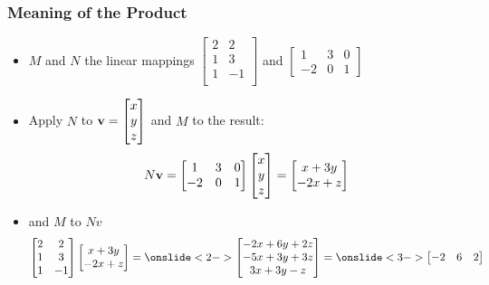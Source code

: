 \documentclass[8pt,dvipsnames]{beamer}
\begin{document}
\begin{frame}
  \frametitle{Meaning of the Product}
  \begin{itemize}
  \item $M$ and $N$ the linear mappings $
    \begin{bmatrix}
      2 & 2\\
      1 & 3\\
      1 & -1\\
    \end{bmatrix}
    $ and 
    $
    \begin{bmatrix}
      1 & 3 & 0\\
      -2 & 0 & 1
    \end{bmatrix}
    $
  \item
    Apply $N$ to $
    \bv = \begin{bmatrix}
      x \\ y \\ z
    \end{bmatrix}
    $
    and $M$ to the result:
    $$
    N \bv = \begin{bmatrix}
      1 & 3 & 0\\
      -2 & 0 & 1
    \end{bmatrix}\begin{bmatrix}
      x \\ y \\ z
    \end{bmatrix}
    = 
    \begin{bmatrix}
      x + 3y\\
      -2x + z
    \end{bmatrix}
    $$\pause
    \item and $M$ to $Nv${\small
      $$
      \begin{bmatrix}
      2 & 2\\
      1 & 3\\
      1 & -1\\
    \end{bmatrix}
     \begin{bmatrix}
      x + 3y\\
      -2x + z
    \end{bmatrix}
    =\onslide<2->
    \begin{bmatrix}
      -2x+6y+2z\\
      -5x + 3y+3z\\
      3x + 3y-z
    \end{bmatrix}
    =\onslide<3->
    \begin{bmatrix}
      -2 & 6 & 2\\

\end{bmatrix}$$}
\end{itemize}
\end{frame}
\end{document}
